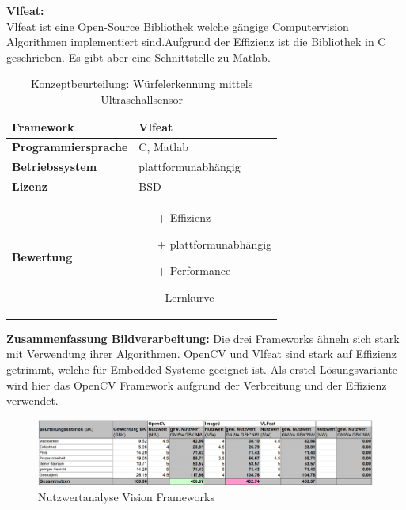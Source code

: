 \documentclass[../../../main.tex]{subfiles}
\begin{document}
        \textbf{Vlfeat: }\\
        Vlfeat ist eine Open-Source Bibliothek welche gängige Computervision Algorithmen implementiert sind.Aufgrund der Effizienz ist die Bibliothek in C geschrieben. Es gibt aber eine Schnittstelle zu Matlab. 
        \begin{flushleft}
            \begin{table}[h]
            \begin{tabular}{ | l | p{11cm} |}
            \hline
            \textbf{Framework} & Vlfeat \\ \hline
            \textbf{Programmiersprache} & C, Matlab \\ \hline
            \textbf{Betriebssystem} & plattformunabhängig \\ \hline
            \textbf{Lizenz} & BSD \\ \hline
            \textbf{Bewertung} &  \begin{itemize}
                                    \item[+] Effizienz
                                    \item[+] plattformunabhängig 
                                    \item[+] Performance
                                    \item[-] Lernkurve 
                                  \end{itemize} \\ \hline
            \end{tabular}
            \caption{Konzeptbeurteilung: Würfelerkennung mittels Ultraschallsensor}
            \label{tab:konzept_wurfel_ultraschall}
            \end{table}
        \end{flushleft}

        \textbf{Zusammenfassung Bildverarbeitung: }
        Die drei Frameworks ähneln sich stark mit Verwendung ihrer Algorithmen. OpenCV und Vlfeat sind stark auf Effizienz getrimmt, welche für Embedded Systeme geeignet ist. Als erstel Lösungsvariante wird hier das OpenCV Framework aufgrund der Verbreitung und der Effizienz verwendet.

        \begin{figure}[H] 
            \centering
            \includegraphics[width=1\textwidth]{Nutzwert_Vision.png}
            \caption{Nutzwertanalyse Vision Frameworks}
            \label{fig:vision_nutzwert}
        \end{figure}
\end{document}
